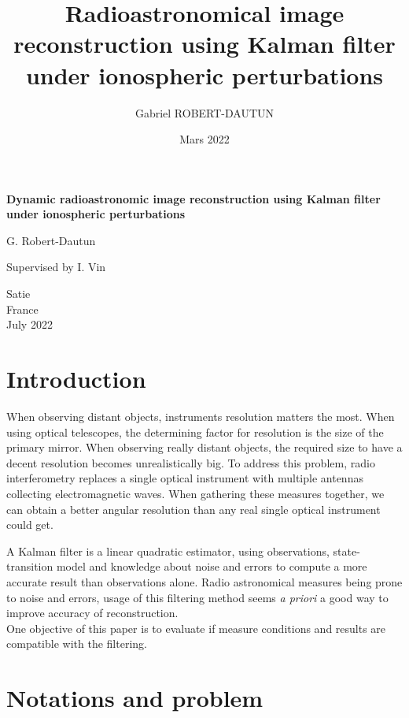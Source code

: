 \documentclass[titlepage]{article}
\author{Gabriel ROBERT-DAUTUN}
\date{Mars 2022}
\title{%
	Radioastronomical image reconstruction using Kalman filter under ionospheric perturbations}
\begin{document}
	
	\begin{titlepage}
	
	\vspace*{.3\textheight}
	\huge
	\centering
	\textbf{Dynamic radioastronomic image reconstruction using Kalman filter under ionospheric perturbations}
	
	\vspace{1cm}
	\LARGE
	G. Robert-Dautun
	
	\vfill
	\large
	Supervised by I. Vin
	
	\vspace{0.8cm}
	
	\Large
	Satie\\
	France\\
	July 2022
	
	\end{titlepage}
	
	\newpage
	\tableofcontents
	
	\newpage
	
	\part{Introduction}
	
	When observing distant objects, instruments resolution matters the most. When using optical telescopes, the determining factor for resolution is the size of the primary mirror. When observing really distant objects, the required size to have a decent resolution becomes unrealistically big. To address this problem, radio interferometry replaces a single optical instrument with multiple antennas collecting electromagnetic waves. When gathering these measures together, we can obtain a better angular resolution than any real single optical instrument could get.
	
		A Kalman filter is a linear quadratic estimator, using observations, state-transition model and knowledge about noise and errors to compute a more accurate result than observations alone. Radio astronomical measures being prone to noise and errors, usage of this filtering method seems \emph{a priori} a good way to improve accuracy of reconstruction. \\
		One objective of this paper is to evaluate if measure conditions and results are compatible with the filtering.
	
	
	
	\newpage
	\part{Notations and problem}
\end{document}
